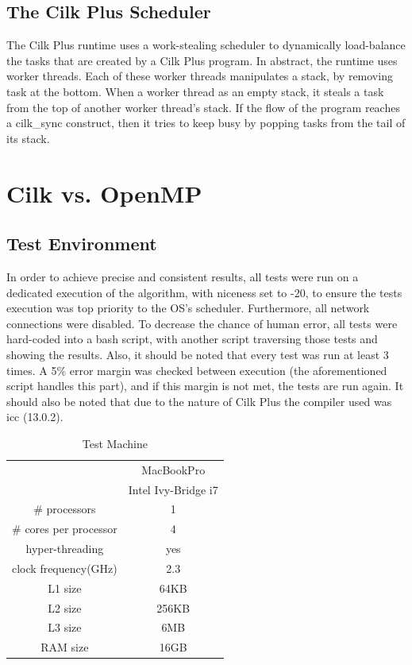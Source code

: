 \documentclass[a4paper,10pt,openright,openbib,twocolumn]{article}
\begin{document}
\subsection{The Cilk Plus Scheduler}
The Cilk Plus runtime uses a work-stealing scheduler to dynamically load-balance the tasks that are created by a Cilk Plus program. In abstract, the runtime uses worker threads. Each of these worker threads manipulates a stack, by removing task at the bottom. When a worker thread as an empty stack, it steals a task from the top of another worker thread's stack. If the flow of the program reaches a cilk\_sync construct, then it tries to keep busy by popping tasks from the tail of its stack.

\section{Cilk vs. OpenMP} \label{openmp}
\subsection{Test Environment}

In order to achieve precise and consistent results, all tests were run on a dedicated execution of the algorithm, with niceness set to -20, to ensure the tests execution was top priority to the OS's scheduler. Furthermore, all network connections were disabled. To decrease the chance of human error, all tests were hard-coded into a bash script, with another script traversing those tests and showing the results. Also, it should be noted that every test was run at least 3 times. A 5\% error margin was checked between execution (the aforementioned script handles this part), and if this margin is not met, the tests are run again. It should also be noted that due to the nature of Cilk Plus the compiler used was icc (13.0.2).

\begin{center}                 
\begin{table}[!hc]
            \begin{tabular}{|c|c|}            
            \hline
              & MacBookPro\\
            & Intel Ivy-Bridge i7\\
            \hline
            \# processors & 1\\
            \# cores per processor & 4\\
            hyper-threading & yes\\
            clock frequency(GHz) & 2.3\\
            L1 size & 64KB\\
            L2 size & 256KB\\
            L3 size & 6MB\\
            RAM size & 16GB\\
            \hline                                
            \end{tabular}
            \caption{Test Machine}
    \end{table}
        \end{center}
\end{document}
